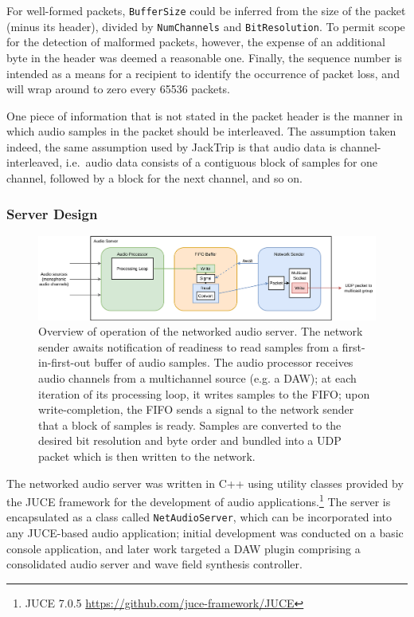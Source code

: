For well-formed packets, \texttt{BufferSize} could be inferred from the size of
the packet (minus its header), divided by \texttt{NumChannels} and
\texttt{BitResolution}.
To permit scope for the detection of malformed packets, however, the expense
of an additional byte in the header was deemed a reasonable one.
Finally, the sequence number is intended as a means for a recipient to identify
the occurrence of packet loss, and will wrap around to zero every \num{65536}
packets.

One piece of information that is not stated in the packet header is the manner
in which audio samples in the packet should be interleaved.
The assumption taken \textemdash{} indeed, the same assumption used by JackTrip
\textemdash{} is that audio data is channel-interleaved, i.e.\ audio data
consists of a contiguous block of samples for one channel, followed by a block
for the next channel, and so on.

\subsubsection{Server Design}

\begin{figure}[ht]
    \centering
    \includegraphics[width=\textwidth]{figures/audio-server}
    \caption{Overview of operation of the networked audio server.
    The network sender awaits notification of readiness to read samples from a
    first-in-first-out buffer of audio samples.
    The audio processor receives audio channels from a multichannel source
        (e.g. a DAW); at each iteration of its processing loop, it writes
        samples to the FIFO; upon write-completion, the FIFO sends a signal to
        the network sender that a block of samples is ready.
        Samples are converted to the desired bit resolution and byte order and
        bundled into a UDP packet which is then written to the network.}
    \label{fig:audio-server}
\end{figure}

The networked audio server was written in C++ using utility classes provided by
the JUCE framework for the development of audio applications.\footnote{
    JUCE 7.0.5 \url{https://github.com/juce-framework/JUCE}
}
The server is encapsulated as a class called \texttt{NetAudioServer},
which can be incorporated into any JUCE-based audio application;
initial development was conducted on a basic console application, and later work
targeted a DAW plugin comprising a consolidated audio server and wave field
synthesis controller.

